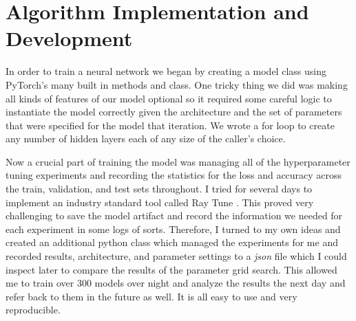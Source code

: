 \documentclass[10pt]{amsart}
\begin{document}
\section{Algorithm Implementation and Development}\label{sec:algorithms}
In order to train a neural network we began by creating a model class using PyTorch's \cite{Ansel_PyTorch_2_Faster_2024} many built in methods and class.
One tricky thing we did was making all kinds of features of our model optional so it required some careful logic to instantiate the model correctly given the architecture and the set of parameters that were specified for the model that iteration.
We wrote a for loop to create any number of hidden layers each of any size of the caller's choice.

Now a crucial part of training the model was managing all of the hyperparameter tuning experiments and recording the statistics for the loss and accuracy across the train, validation, and test sets throughout.
I tried for several days to implement an industry standard tool called Ray Tune \cite{liaw2018tune}.
This proved very challenging to save the model artifact and record the information we needed for each experiment in some logs of sorts.
Therefore, I turned to my own ideas and created an additional python class which managed the experiments for me and recorded results, architecture, and parameter settings to a \textit{json} file which I could inspect later to compare the results of the parameter grid search.
This allowed me to train over 300 models over night and analyze the results the next day and refer back to them in the future as well.
It is all easy to use and very reproducible.
\end{document}
